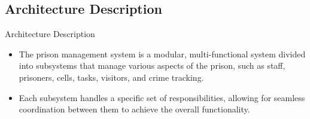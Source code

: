 \documentclass[aspectratio=169]{beamer}
\begin{document}
\subsection{Architecture Description}
\begin{frame}{Architecture Description}
    \begin{itemize}
        \item The prison management system is a modular, multi-functional system divided into subsystems that manage various aspects of the prison, such as staff, prisoners, cells, tasks, visitors, and crime tracking. 
        \item Each subsystem handles a specific set of responsibilities, allowing for seamless coordination between them to achieve the overall functionality.\cite{designdoc}
    \end{itemize}
\end{frame}
\end{document}
